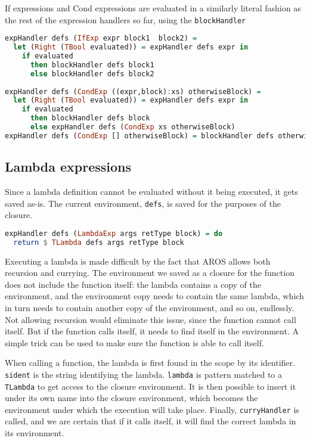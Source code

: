 If expressions and Cond expressions are evaluated in a similarly literal fashion as the rest of the expression handlers so far, using the \lstinline{blockHandler}
\begin{lstlisting}[caption={},language=haskell]
expHandler defs (IfExp expr block1  block2) =
  let (Right (TBool evaluated)) = expHandler defs expr in
    if evaluated
      then blockHandler defs block1
      else blockHandler defs block2
      
expHandler defs (CondExp ((expr,block):xs) otherwiseBlock) =
  let (Right (TBool evaluated)) = expHandler defs expr in
    if evaluated
      then blockHandler defs block
      else expHandler defs (CondExp xs otherwiseBlock)
expHandler defs (CondExp [] otherwiseBlock) = blockHandler defs otherwiseBlock
\end{lstlisting}

\subsection{Lambda expressions}

Since a lambda definition cannot be evaluated without it being executed, it gets saved as-is. The current environment, \lstinline{defs}, is saved for the purposes of the closure.
\begin{lstlisting}[caption={},language=haskell]
expHandler defs (LambdaExp args retType block) = do
  return $ TLambda defs args retType block
\end{lstlisting}


Executing a lambda is made difficult by the fact that AROS allows both recursion and currying. The environment we saved as a closure for the function does not include the function itself: the lambda contains a copy of the environment, and the environment copy needs to contain the same lambda, which in turn needs to contain another copy of the environment, and so on, endlessly. Not allowing recursion would eliminate this issue, since the function cannot call itself. But if the function calls itself, it needs to find itself in the environment. A simple trick can be used to make sure the function is able to call itself.
\par
When calling a function, the lambda is first found in the scope by its identifier. \lstinline{sident} is the string identifying the lambda. \lstinline{lambda} is pattern matched to a \lstinline{TLambda} to get access to the closure environment. It is then possible to insert it under its own name into the closure environment, which becomes the environment under which the execution will take place. Finally, \lstinline{curryHandler} is called, and we are certain that if it calls itself, it will find the correct lambda in its environment.

